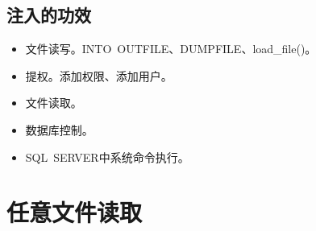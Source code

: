 \subsection{注入的功效}
\begin{itemize}
    \item 文件读写。INTO\ OUTFILE、DUMPFILE、load\_file()。
    \item 提权。添加权限、添加用户。
    \item 文件读取。
    \item 数据库控制。
    \item SQL\ SERVER中系统命令执行。
\end{itemize}

\section{任意文件读取}